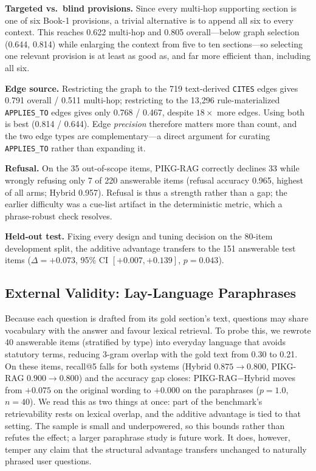 \documentclass[conference]{IEEEtran}
\begin{document}
\textbf{Targeted vs.\ blind provisions.} Since every multi-hop supporting section is one of six Book-1
provisions, a trivial alternative is to append all six to every context. This reaches 0.622 multi-hop
and 0.805 overall---below graph selection (0.644, 0.814) while enlarging the context from five to ten
sections---so selecting one relevant provision is at least as good as, and far more efficient than,
including all six.

\textbf{Edge source.} Restricting the graph to the 719 text-derived \texttt{CITES} edges gives 0.791
overall / 0.511 multi-hop; restricting to the 13{,}296 rule-materialized \texttt{APPLIES\_TO} edges
gives only 0.768 / 0.467, despite $18\times$ more edges. Using both is best (0.814 / 0.644). Edge
\emph{precision} therefore matters more than count, and the two edge types are complementary---a
direct argument for curating \texttt{APPLIES\_TO} rather than expanding it.

\textbf{Refusal.} On the 35 out-of-scope items, PIKG-RAG correctly declines 33 while wrongly refusing
only 7 of 220 answerable items (refusal accuracy 0.965, highest of all arms; Hybrid 0.957). Refusal
is thus a strength rather than a gap; the earlier difficulty was a cue-list artifact in the
deterministic metric, which a phrase-robust check resolves.

\textbf{Held-out test.} Fixing every design and tuning decision on the 80-item development split, the
additive advantage transfers to the 151 answerable test items ($\Delta=+0.073$, 95\% CI
$[+0.007,+0.139]$, $p=0.043$).

\subsection{External Validity: Lay-Language Paraphrases}
\label{sec:paraphrase}

Because each question is drafted from its gold section's text, questions may share vocabulary with
the answer and favour lexical retrieval. To probe this, we rewrote 40 answerable items (stratified by
type) into everyday language that avoids statutory terms, reducing 3-gram overlap with the gold text
from 0.30 to 0.21. On these items, recall@5 falls for both systems (Hybrid $0.875\!\to\!0.800$,
PIKG-RAG $0.900\!\to\!0.800$) and the accuracy gap closes: PIKG-RAG$-$Hybrid moves from $+0.075$ on
the original wording to $+0.000$ on the paraphrases ($p=1.0$, $n=40$). We read this as two things at
once: part of the benchmark's retrievability rests on lexical overlap, and the additive advantage is
tied to that setting. The sample is small and underpowered, so this bounds rather than refutes the
effect; a larger paraphrase study is future work. It does, however, temper any claim that the
structural advantage transfers unchanged to naturally phrased user questions.
\end{document}
